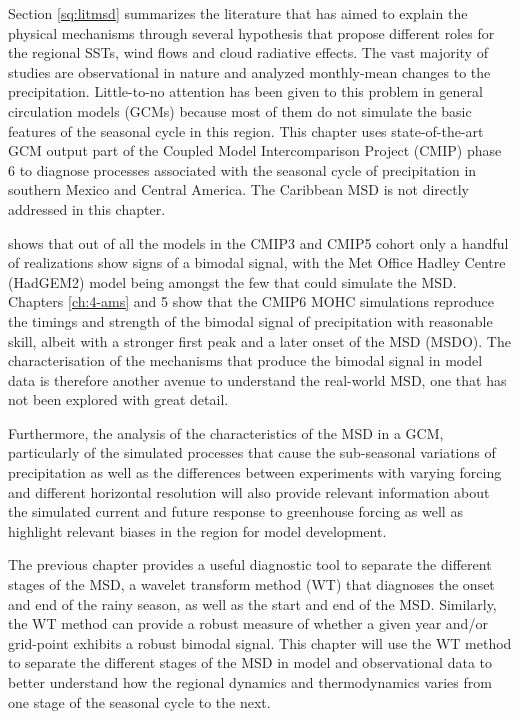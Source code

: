 Section \ref{sq:litmsd} summarizes the literature that has aimed to explain the physical mechanisms through several hypothesis that propose different roles for the regional SSTs, wind flows and cloud radiative effects. The vast majority of studies are observational in nature and analyzed monthly-mean changes to the precipitation. 
Little-to-no attention has been given to this problem in general circulation models (GCMs) because most of them do not simulate the basic features of the seasonal cycle in this region. 
This chapter uses state-of-the-art GCM output part of the Coupled Model Intercomparison Project (CMIP) phase 6 to diagnose processes associated with the seasonal cycle of precipitation in southern Mexico and Central America. The Caribbean MSD is not directly addressed in this chapter.

\cite{ryu2014} shows that out of all the models in the CMIP3 and CMIP5 cohort only a handful of realizations show signs of a bimodal signal, with the Met Office Hadley Centre (HadGEM2) model being amongst the few that could simulate the MSD. 
 Chapters \ref{ch:4-ams} and 5 show that the CMIP6 MOHC simulations reproduce the timings and strength of the bimodal signal of precipitation with reasonable skill, albeit with a stronger first peak and a later onset of the MSD (MSDO). 
 The characterisation of the mechanisms that produce the bimodal signal in model data is therefore another avenue to understand the real-world MSD, one that has not been explored with great detail.
 
  Furthermore, the analysis of the characteristics of the MSD in a GCM, particularly of the simulated processes that cause the sub-seasonal variations of precipitation  as well as the differences between experiments with varying forcing and different horizontal resolution will also provide relevant information about the simulated current and future response to greenhouse forcing as well as highlight relevant biases in the region for model development. 

The previous chapter provides a useful diagnostic tool to separate the different stages of the MSD, a wavelet transform method (WT) that diagnoses the onset and end of the rainy season, as well as the start and end of the MSD. Similarly, the WT method can provide a robust measure of whether a given year and/or grid-point exhibits a robust bimodal signal. This chapter will use the WT method to separate the different stages of the MSD in model and observational data to better understand how the regional dynamics and thermodynamics varies from one stage of the seasonal cycle to the next. 

